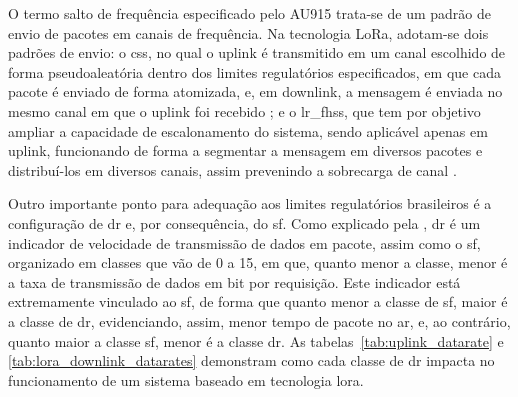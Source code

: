 O termo salto de frequência especificado pelo AU915 trata-se de um padrão de envio 
de pacotes em canais de frequência. Na tecnologia LoRa, adotam-se dois padrões de envio: 
o \gls{css}, no qual o uplink é transmitido em um canal escolhido de forma pseudoaleatória 
dentro dos limites regulatórios especificados, em que cada pacote é enviado de forma atomizada, e, 
em downlink, a mensagem é enviada no mesmo canal em que o uplink foi recebido 
\cite{semtech2024an1200_86}; e o \gls{lr_fhss}, que tem por objetivo ampliar a capacidade 
de escalonamento do sistema, sendo aplicável apenas em uplink, funcionando de 
forma a segmentar a mensagem em diversos pacotes e distribuí-los em diversos canais, 
assim prevenindo a sobrecarga de canal \cite{lora_alliance_rp002_105}.

Outro importante ponto para adequação aos limites regulatórios brasileiros 
é a configuração de \gls{dr} e, por consequência, 
do \gls{sf}. Como explicado pela , \gls{dr} 
é um indicador de velocidade de transmissão de dados em pacote, 
assim como o \gls{sf}, organizado em classes que vão de 0 a 15, 
em que, quanto menor a classe, menor é a taxa de transmissão de dados 
em bit por requisição. Este indicador está extremamente vinculado ao \gls{sf}, 
de forma que quanto menor a classe de \gls{sf}, maior é a classe de \gls{dr}, 
evidenciando, assim, menor tempo de pacote no ar, e, ao contrário, 
quanto maior a classe \gls{sf}, menor é a classe \gls{dr}. 
As tabelas~\ref{tab:uplink_datarate} e \ref{tab:lora_downlink_datarates} demonstram como cada 
classe de \gls{dr} impacta no funcionamento de um sistema baseado em tecnologia \gls{lora}.

